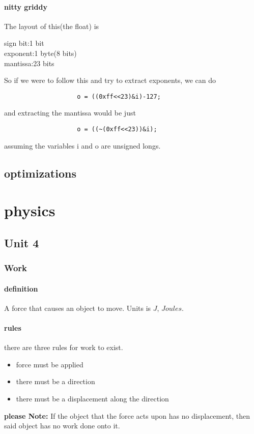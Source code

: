 \documentclass{article} %
\begin{document}
            \paragraph{nitty griddy}
                The layout of this(the float) is 
                \begin{center}
                    sign bit:1 bit\\
                    exponent:1 byte(8 bits)\\
                    mantissa:23 bits\\
                \end{center}
                So if we were to follow this and try to extract exponents, we can do
                \begin{verbatim}
                    o = ((0xff<<23)&i)-127;
                \end{verbatim}
                and extracting the mantissa would be just 
                \begin{verbatim}
                    o = ((~(0xff<<23))&i);
                \end{verbatim}
                assuming the variables i and o are unsigned longs.
    \subsection{optimizations}
\section{physics}
    \subsection{Unit 4}
        \subsubsection{Work}
            \paragraph{definition}
                A force that causes an object to move. Units is $J$, $Joules$.
            \paragraph{rules}
                there are three rules for work to exist.
                \begin{itemize}
                    \item force must be applied
                    \item there must be a direction
                    \item there must be a displacement along the direction
                \end{itemize}
                \textbf{please Note:} 
                If the object that the force acts upon has no displacement, then said object has no work done onto it.
\end{document}
